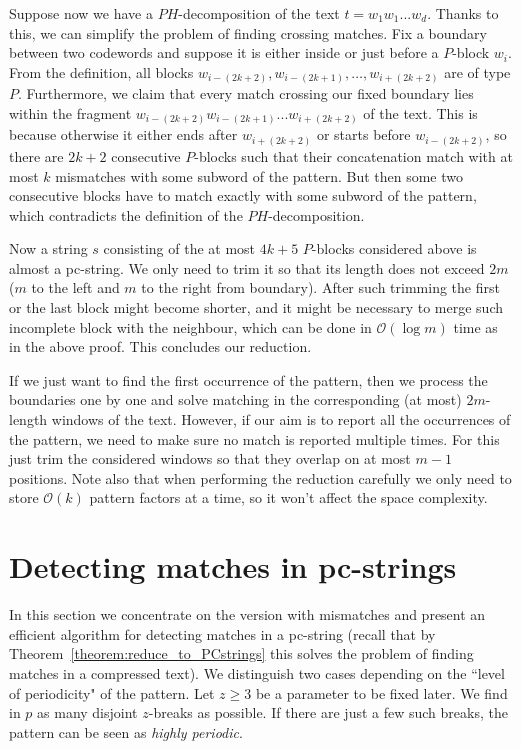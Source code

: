 \documentclass[runningheads]{llncs}
\begin{document}
Suppose now we have a $PH$-decomposition of the text $t=w_1w_1...w_d$. Thanks to this, we can simplify the problem of finding crossing matches. Fix a boundary between two codewords and suppose it is either inside or just before a $P$-block $w_i$. From the definition, all blocks $w_{i-(2k+2)},w_{i-(2k+1)}, \ldots, w_{i+(2k+2)}$ are of type $P$.  Furthermore, we claim that every match crossing our fixed boundary lies within the fragment $w_{i-(2k+2)}w_{i-(2k+1)}...w_{i+(2k+2)}$ of the text. This is because otherwise it either ends after $w_{i+(2k+2)}$ or starts before $w_{i-(2k+2)}$, so there are $2k+2$ consecutive $P$-blocks such that their concatenation match with at most $k$ mismatches with some subword of the pattern. But then some two consecutive blocks have to match exactly with some subword of the pattern, which contradicts the definition of the $PH$-decomposition.

Now a string $s$ consisting of the at most $4k+5$ $P$-blocks considered above is almost a pc-string. We only need to trim it so that its length does not exceed $2m$ ($m$ to the left and $m$ to the right from boundary). After such trimming the first or the last block might become shorter, and it might be necessary to merge such incomplete block with the neighbour, which can be done in $\mathcal{O}(\log m)$ time as in the above proof. This concludes our reduction.

If we just want to find the first occurrence of the pattern, then we process the boundaries one by one and solve matching in the corresponding (at most) $2m$-length windows of the text. However, if our aim is to report all the occurrences of the pattern, we need to make sure no match is reported multiple times. For this just trim the considered windows so that they overlap on at most $m-1$ positions. Note also that when performing the reduction carefully we only need to store $\mathcal{O}(k)$ pattern factors at a time, so it won't affect the space complexity.

\section{Detecting matches in pc-strings}
\label{section:weakly}

In this section we concentrate on the version with mismatches and present an efficient algorithm for detecting matches in a pc-string (recall that by Theorem~\ref{theorem:reduce_to_PCstrings} this solves the problem of finding matches in a compressed text).
We distinguish two cases depending on the ``level of periodicity" of the pattern. Let $z\geq 3$ be a parameter to be fixed later. We find in $p$ as many disjoint $z$-breaks as possible. If there are just a few such breaks, the pattern can be seen as {\it highly periodic}.
\end{document}
